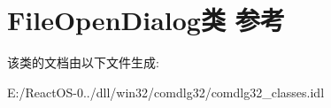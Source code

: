 \hypertarget{class_file_open_dialog}{}\section{File\+Open\+Dialog类 参考}
\label{class_file_open_dialog}


该类的文档由以下文件生成\+:\begin{DoxyCompactItemize}
\item 
E\+:/\+React\+O\+S-\/0../dll/win32/comdlg32/comdlg32\+\_\+classes.\+idl\end{DoxyCompactItemize}
